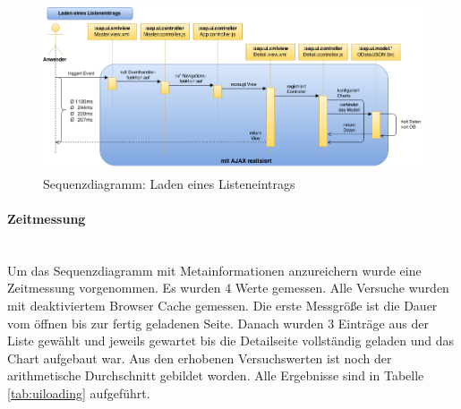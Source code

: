 \vspace{1em}
\begin{figure}[htb]
  \centering
  \includegraphics[width=1.05\linewidth,angle=90]{abb/sapui5_load_list_entry}
  \caption[Sequenzdiagramm: Laden eines Listeneintrags]{Sequenzdiagramm: Laden eines Listeneintrags}
  \label{fig:sapui5loadlistentry}
\end{figure}

\paragraph{Zeitmessung}$\;$ \\
Um das Sequenzdiagramm mit Metainformationen anzureichern wurde eine Zeitmessung vorgenommen. Es wurden 4 Werte gemessen. Alle Versuche wurden mit deaktiviertem Browser Cache gemessen. Die erste Messgröße ist die Dauer vom öffnen bis zur fertig geladenen Seite. Danach wurden 3 Einträge aus der Liste gewählt und jeweils gewartet bis die Detailseite vollständig geladen und das Chart aufgebaut war. Aus den erhobenen Versuchswerten ist noch der arithmetische Durchschnitt gebildet worden. Alle Ergebnisse sind in Tabelle \ref{tab:uiloading} aufgeführt.

